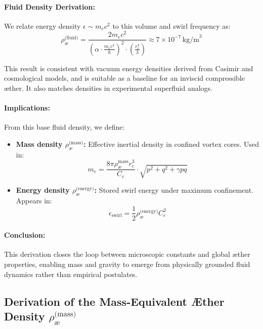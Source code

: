 \documentclass[preprint]{revtex4-2}
\begin{document}
                \paragraph{Fluid Density Derivation:}
                We relate energy density \( \epsilon \sim m_e c^2 \) to this volume and swirl frequency as:
                \[
                \rho_{\text{\ae}}^{\text{(fluid)}} = \frac{2 m_e c^2}{\left( \alpha \cdot \frac{m_e c^2}{\hbar} \right)^2 \cdot \left( \frac{r_e^3}{3} \right)} \approx 7 \times 10^{-7} \, \text{kg/m}^3
                \]
        
                This result is consistent with vacuum energy densities derived from Casimir and cosmological models, and is suitable as a baseline for an inviscid compressible æther. It also matches densities in experimental superfluid analogs.
        
                \paragraph{Implications:}
                From this base fluid density, we define:
                \begin{itemize}
                    \item \textbf{Mass density \boldmath\( \rho_{\text{\ae}}^{\text{(mass)}} \):} Effective inertial density in confined vortex cores. Used in:
                    \[
                    m_e = \frac{8\pi \rho_{\text{\ae}}^{\text{mass}} r_c^3}{C_e} \cdot \sqrt{p^2 + q^2 + \gamma pq}
                    \]
                    \item \textbf{Energy density \boldmath\( \rho_{\text{\ae}}^{\text{(energy)}} \):} Stored swirl energy under maximum confinement. Appears in:
                    \[
                    \epsilon_{\text{swirl}} = \frac{1}{2} \rho_{\text{\ae}}^{\text{(energy)}} C_e^2
                    \]
                \end{itemize}
        
                \paragraph{Conclusion:}
                This derivation closes the loop between microscopic constants and global æther properties, enabling mass and gravity to emerge from physically grounded fluid dynamics rather than empirical postulates.
        
                \subsection{Derivation of the Mass-Equivalent Æther Density \boldmath\( \rho_{\text{\ae}}^{\text{(mass)}} \)}
        
\end{document}

